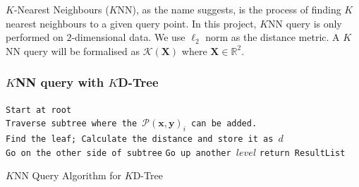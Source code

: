 $K$-Nearest Neighbours ($K$NN), as the name suggests, is the process of finding $K$ nearest neighbours to a given query point. In this project, $K$NN query is only performed on $2$-dimensional data. We use $\ell_2$ norm as the distance metric. A $K$NN query will be formalised as $\mathcal{K}(\boldsymbol{X})$ where $\boldsymbol{X}\in\mathbb{R}^2$.

\subsubsection{$K$NN query with $K$D-Tree}

\begin{algorithm}[H]
    \SetAlgoLined
    {
        \texttt{Start at root}\\
        \texttt{Traverse subtree where the $\mathcal{P}(\boldsymbol{x}, \boldsymbol{y})_i$ can be added.}\\
        \texttt{Find the leaf; Calculate the distance and store it as $d$}\\
            {
                    {
                        \texttt{Go on the other side of subtree} 
                    }
                        {
                            \texttt{Go up another $level$}
                        }
            }
            {
                \texttt{return ResultList}
            }
        
    }
    \caption{$K$NN Query Algorithm for $K$D-Tree}
    \label{$K$NN_Query_Algorithm_$K$D-Tree}
\end{algorithm}

